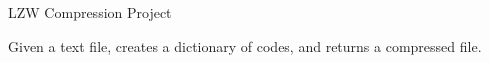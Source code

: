 \begin{cventriesproj}
\cventryproj
{LZW Compression Project } %
{
\begin{cvitems}
\item {Given a text file, creates a dictionary of codes, and returns a compressed file.}
\end{cvitems}
}








\end{cventriesproj}
